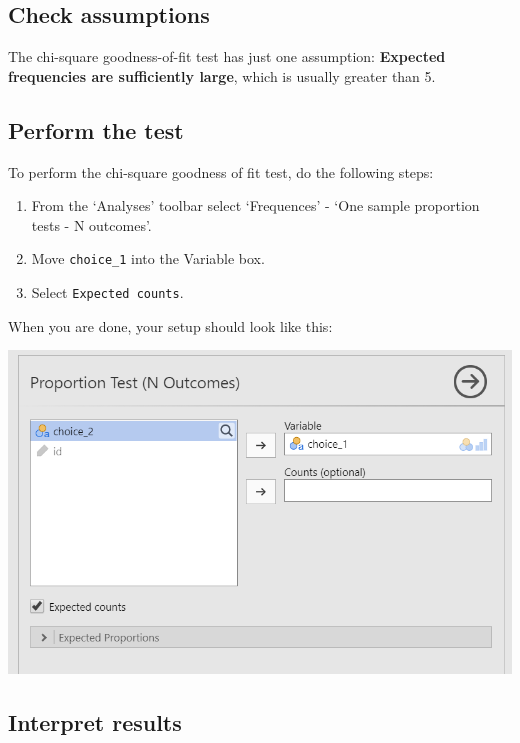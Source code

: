 \documentclass[
]{book}
\begin{document}
\hypertarget{check-assumptions-3}{%
\subsection{Check assumptions}\label{check-assumptions-3}}

The chi-square goodness-of-fit test has just one assumption: \textbf{Expected frequencies are sufficiently large}, which is usually greater than 5.

\hypertarget{perform-the-test-3}{%
\subsection{Perform the test}\label{perform-the-test-3}}

To perform the chi-square goodness of fit test, do the following steps:

\begin{enumerate}
\def\labelenumi{\arabic{enumi}.}
\item
  From the `Analyses' toolbar select `Frequences' - `One sample proportion tests - N outcomes'.
\item
  Move \texttt{choice\_1} into the Variable box.
\item
  Select \texttt{Expected\ counts}.
\end{enumerate}

When you are done, your setup should look like this:

\includegraphics{images/09-chi-square/chi-square_setup.png}

\hypertarget{interpret-results-2}{%
\subsection{Interpret results}\label{interpret-results-2}}
\end{document}
